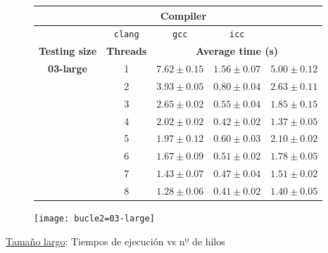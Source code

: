 \begin{figure}[H]
    \centering
    \begin{subfigure}{0.4\textwidth}
        \begin{adjustbox}{width=\textwidth} 
        \begin{tabular}{|c|c|c|c|c|}
            \hline
            \rowcolor{azul} \multicolumn{2}{|c|}{}&\multicolumn{3}{c|}{\textbf{Compiler}} \\ \hline
            \rowcolor{azul} \multicolumn{2}{|c|}{}&\texttt{clang}&\texttt{gcc}&\texttt{icc}\\ \hline
            \rowcolor{azul} \textbf{Testing size} & \textbf{Threads}&\multicolumn{3}{c|}{\textbf{Average time (s)}} \\ \hline
            \multirow{8}{1cm}{\textbf{03-large}} & 1 & \(7.62\pm{0.15}\) & \(1.56\pm{0.07}\) & \(5.00\pm{0.12}\) \\ \cline{2-5}
            & 2 & \(3.93\pm{0.05}\) & \(0.80\pm{0.04}\) & \(2.63\pm{0.11}\) \\ \cline{2-5}
            & 3 & \(2.65\pm{0.02}\) & \(0.55\pm{0.04}\) & \(1.85\pm{0.15}\) \\ \cline{2-5}
            & 4 & \(2.02\pm{0.02}\) & \(0.42\pm{0.02}\) & \(1.37\pm{0.05}\) \\ \cline{2-5}
            & 5 & \(1.97\pm{0.12}\) & \(0.60\pm{0.03}\) & \(2.10\pm{0.02}\) \\ \cline{2-5}
            & 6 & \(1.67\pm{0.09}\) & \(0.51\pm{0.02}\) & \(1.78\pm{0.05}\) \\ \cline{2-5}
            & 7 & \(1.43\pm{0.07}\) & \(0.47\pm{0.04}\) & \(1.51\pm{0.02}\) \\ \cline{2-5}
            & 8 & \(1.28\pm{0.06}\) & \(0.41\pm{0.02}\) & \(1.40\pm{0.05}\) \\ \hline
        \end{tabular}
        \end{adjustbox}
    \end{subfigure}
    \hfill
    \begin{subfigure}{0.5\textwidth}
        \texttt{[image: bucle2=03-large]}
    \end{subfigure}
    \caption{\underline{Tamaño largo}: Tiempos de ejecución vs nº de hilos}
    \label{bucle2=03-large}
\end{figure}

